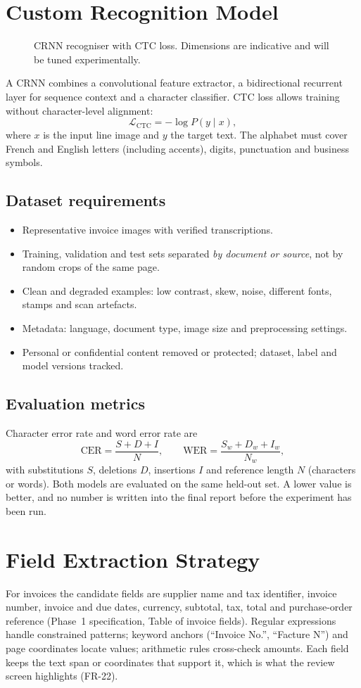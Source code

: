 \section{Custom Recognition Model}
\begin{figure}[H]\centering
\resizebox{\textwidth}{!}{}
\caption{CRNN recogniser with CTC loss. Dimensions are indicative and will be tuned experimentally.}\label{fig:crnn}
\end{figure}
A CRNN combines a convolutional feature extractor, a bidirectional recurrent layer for sequence context and a character classifier. CTC loss allows training without character-level alignment:
\[
\mathcal{L}_{\text{CTC}} = -\log P(y\mid x),
\]
where $x$ is the input line image and $y$ the target text. The alphabet must cover French and English letters (including accents), digits, punctuation and business symbols.

\subsection{Dataset requirements}
\begin{itemize}
\item Representative invoice images with verified transcriptions.
\item Training, validation and test sets separated \emph{by document or source}, not by random crops of the same page.
\item Clean and degraded examples: low contrast, skew, noise, different fonts, stamps and scan artefacts.
\item Metadata: language, document type, image size and preprocessing settings.
\item Personal or confidential content removed or protected; dataset, label and model versions tracked.
\end{itemize}

\subsection{Evaluation metrics}
Character error rate and word error rate are
\[
\mathrm{CER}=\frac{S+D+I}{N},\qquad \mathrm{WER}=\frac{S_w+D_w+I_w}{N_w},
\]
with substitutions $S$, deletions $D$, insertions $I$ and reference length $N$ (characters or words). Both models are evaluated on the same held-out set. A lower value is better, and no number is written into the final report before the experiment has been run.

\section{Field Extraction Strategy}
For invoices the candidate fields are supplier name and tax identifier, invoice number, invoice and due dates, currency, subtotal, tax, total and purchase-order reference (Phase~1 specification, Table of invoice fields). Regular expressions handle constrained patterns; keyword anchors (``Invoice No.'', ``Facture N\textdegree'') and page coordinates locate values; arithmetic rules cross-check amounts. Each field keeps the text span or coordinates that support it, which is what the review screen highlights (FR-22).

